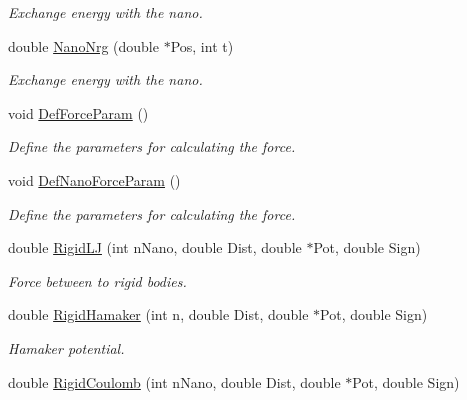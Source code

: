 \begin{DoxyCompactItemize}
\begin{DoxyCompactList}\small\item\em \-Exchange energy with the nano. \end{DoxyCompactList}\item 
\hypertarget{classForces_af2058d93db6e3ef4894d33f6790a6749}{double \hyperlink{classForces_af2058d93db6e3ef4894d33f6790a6749}{\-Nano\-Nrg} (double $\ast$\-Pos, int t)}\label{classForces_af2058d93db6e3ef4894d33f6790a6749}

\begin{DoxyCompactList}\small\item\em \-Exchange energy with the nano. \end{DoxyCompactList}\item 
\hypertarget{classForces_ad7e01b1bd04ce252d991ae872eaa5270}{void \hyperlink{classForces_ad7e01b1bd04ce252d991ae872eaa5270}{\-Def\-Force\-Param} ()}\label{classForces_ad7e01b1bd04ce252d991ae872eaa5270}

\begin{DoxyCompactList}\small\item\em \-Define the parameters for calculating the force. \end{DoxyCompactList}\item 
\hypertarget{classForces_ae1187ff72e7ad2765b17948df1aff2b4}{void \hyperlink{classForces_ae1187ff72e7ad2765b17948df1aff2b4}{\-Def\-Nano\-Force\-Param} ()}\label{classForces_ae1187ff72e7ad2765b17948df1aff2b4}

\begin{DoxyCompactList}\small\item\em \-Define the parameters for calculating the force. \end{DoxyCompactList}\item 
\hypertarget{classForces_a299061ca48b352b4d40c0dfbb6ffd2da}{double \hyperlink{classForces_a299061ca48b352b4d40c0dfbb6ffd2da}{\-Rigid\-L\-J} (int n\-Nano, double \-Dist, double $\ast$\-Pot, double \-Sign)}\label{classForces_a299061ca48b352b4d40c0dfbb6ffd2da}

\begin{DoxyCompactList}\small\item\em \-Force between to rigid bodies. \end{DoxyCompactList}\item 
double \hyperlink{classForces_abd9350bc451b7ae5507675805b4318d5}{\-Rigid\-Hamaker} (int n, double \-Dist, double $\ast$\-Pot, double \-Sign)
\begin{DoxyCompactList}\small\item\em \-Hamaker potential. \end{DoxyCompactList}\item 
\hypertarget{classForces_af8f6e965e516633b54115556243a681a}{double \hyperlink{classForces_af8f6e965e516633b54115556243a681a}{\-Rigid\-Coulomb} (int n\-Nano, double \-Dist, double $\ast$\-Pot, double \-Sign)}\label{classForces_af8f6e965e516633b54115556243a681a}


\end{DoxyCompactItemize}
